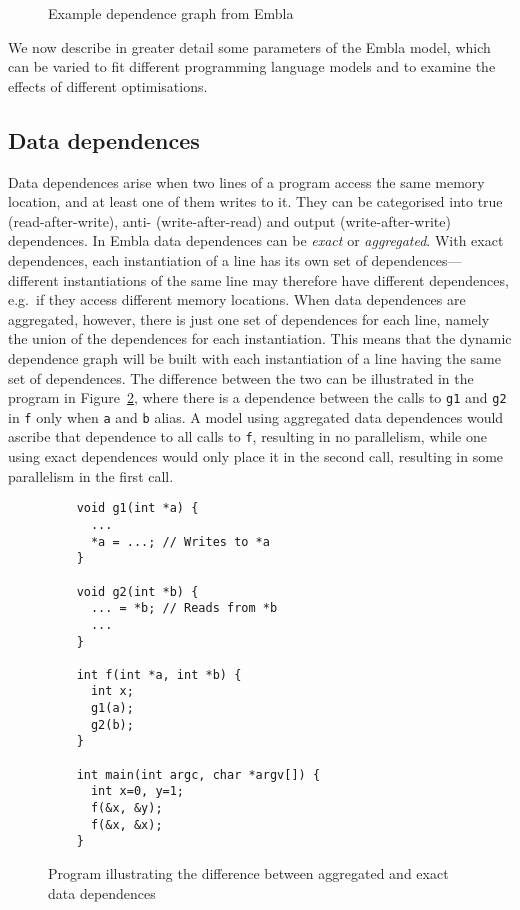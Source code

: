 \begin{figure}
  \begin{center}
  \small
  
  \end{center}
  \nocaptionrule \caption{Example dependence graph from Embla}
  \label{example-depgraph}
\end{figure}

We now describe in greater detail some parameters of the Embla model, which can be varied to fit different programming language models and to examine the effects of different optimisations.

\subsection{Data dependences}
Data dependences arise when two lines of a program access the same memory location, and at least one of them writes to it.
They can be categorised into true (read-after-write), anti- (write-after-read) and output (write-after-write) dependences.
In Embla data dependences can be \emph{exact} or \emph{aggregated}.
With exact dependences, each instantiation of a line has its own set of dependences---different instantiations of the same line may therefore have different dependences, e.g.\ if they access different memory locations.
When data dependences are aggregated, however, there is just one set of dependences for each line, namely the union of the dependences for each instantiation.
This means that the dynamic dependence graph will be built with each instantiation of a line having the same set of dependences.
The difference between the two can be illustrated in the program in Figure~\ref{datadeps}, where there is a dependence between the calls to \texttt{g1} and \texttt{g2} in \texttt{f} only when \texttt{a} and \texttt{b} alias.
A model using aggregated data dependences would ascribe that dependence to all calls to \texttt{f}, resulting in no parallelism, while one using exact dependences would only place it in the second call, resulting in some parallelism in the first call.

\begin{figure}
  \begin{center}
  \small
  \begin{verbatim}
    void g1(int *a) {
      ...
      *a = ...; // Writes to *a
    }
  
    void g2(int *b) {
      ... = *b; // Reads from *b
      ...
    }

    int f(int *a, int *b) {
      int x;
      g1(a);
      g2(b);
    }

    int main(int argc, char *argv[]) {
      int x=0, y=1;
      f(&x, &y);
      f(&x, &x);
    }
  \end{verbatim}
  \end{center}
  \caption{Program illustrating the difference between aggregated and exact data dependences}
  \label{datadeps}
\end{figure}

